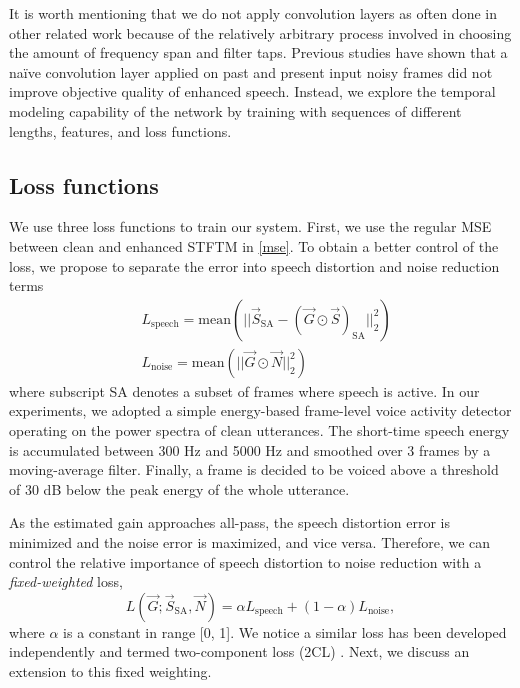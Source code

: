 \documentclass{article}
\begin{document}
It is worth mentioning that we do not apply convolution layers as often done in other related work \cite{tan2018convolutional,zhao2018convolutional} because of the relatively arbitrary process involved in choosing the amount of frequency span and filter taps. Previous studies \cite{liu2014experiments} have shown that a na\"ive convolution layer applied on past and present input noisy frames did not improve objective quality of enhanced speech. Instead, we explore the temporal modeling capability of the network by training with sequences of different lengths, features, and loss functions.



\subsection{Loss functions}
We use three loss functions to train our system. First, we use the regular \ac{MSE} between clean and enhanced \ac{STFTM} in \eqref{mse}. To obtain a better control of the loss, we propose to separate the error into speech distortion and noise reduction terms
\begin{align}
&L_\text{speech} = \text{mean}(||\vec{S}_{\text{SA}}-(\vec{G} \odot \vec{S})_{\text{SA}}||^2_2)\\
&L_\text{noise} = \text{mean}(||\vec{G} \odot \vec{N}||^2_2)
\end{align}
where subscript SA denotes a subset of frames where speech is active. In our experiments, we adopted a simple energy-based frame-level voice activity detector operating on the power spectra of clean utterances. The short-time speech energy is accumulated between 300 Hz and 5000 Hz and smoothed over 3 frames by a moving-average filter. Finally, a frame is decided to be voiced above a threshold of 30 dB below the peak energy of the whole utterance.

As the estimated gain approaches all-pass, the speech distortion error is minimized and the noise error is maximized, and vice versa. Therefore, we can control the relative importance of speech distortion to noise reduction with a \textit{fixed-weighted} loss, 
\begin{equation}
\label{eq:weighted_loss}
L(\vec{G}; \vec{S}_{\text{SA}}, \vec{N}) = \alpha L_\text{speech} + (1-\alpha)L_\text{noise},
\end{equation}
where $\alpha$ is a constant in range [0, 1]. We notice a similar loss has been developed independently and termed two-component loss (2CL) \cite{xu2019components}. Next, we discuss an extension to this fixed weighting.
\end{document}
